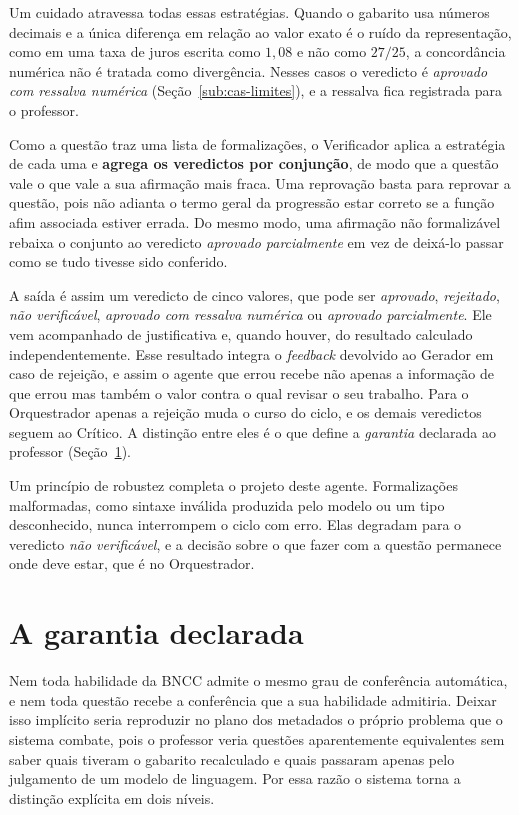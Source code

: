 Um cuidado atravessa todas essas estratégias. Quando o gabarito usa números decimais e a única
diferença em relação ao valor exato é o ruído da representação, como em uma taxa de juros escrita
como $1{,}08$ e não como $27/25$, a concordância numérica não é tratada como divergência. Nesses
casos o veredicto é \emph{aprovado com ressalva numérica} (Seção~\ref{sub:cas-limites}), e a
ressalva fica registrada para o professor.

Como a questão traz uma lista de formalizações, o Verificador aplica a estratégia de cada uma e
\textbf{agrega os veredictos por conjunção}, de modo que a questão vale o que vale a sua afirmação
mais fraca. Uma reprovação basta para reprovar a questão, pois não adianta o termo geral da
progressão estar correto se a função afim associada estiver errada. Do mesmo modo, uma afirmação
não formalizável rebaixa o conjunto ao veredicto \emph{aprovado parcialmente} em vez de deixá-lo
passar como se tudo tivesse sido conferido.

A saída é assim um veredicto de cinco valores, que pode ser \emph{aprovado}, \emph{rejeitado},
\emph{não verificável}, \emph{aprovado com ressalva numérica} ou \emph{aprovado parcialmente}. Ele
vem acompanhado de justificativa e, quando houver, do resultado calculado independentemente. Esse
resultado integra o \emph{feedback} devolvido ao Gerador em caso de rejeição, e assim o agente que
errou recebe não apenas a informação de que errou mas também o valor contra o qual revisar o seu
trabalho. Para o Orquestrador apenas a rejeição muda o curso do ciclo, e os demais veredictos
seguem ao Crítico. A distinção entre eles é o que define a \emph{garantia} declarada ao professor
(Seção~\ref{sec:garantia}).

Um princípio de robustez completa o projeto deste agente. Formalizações malformadas, como sintaxe
inválida produzida pelo modelo ou um tipo desconhecido, nunca interrompem o ciclo com erro.
Elas degradam para o veredicto \emph{não verificável}, e a decisão sobre o que fazer com a questão
permanece onde deve estar, que é no Orquestrador.

\section{A garantia declarada}
\label{sec:garantia}

Nem toda habilidade da BNCC admite o mesmo grau de conferência automática, e nem toda questão
recebe a conferência que a sua habilidade admitiria. Deixar isso implícito seria reproduzir no plano
dos metadados o próprio problema que o sistema combate, pois o professor veria questões
aparentemente equivalentes sem saber quais tiveram o gabarito recalculado e quais passaram apenas
pelo julgamento de um modelo de linguagem. Por essa razão o sistema torna a distinção explícita em
dois níveis.

